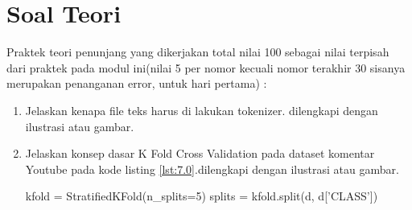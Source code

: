 \section{Soal Teori}
Praktek teori penunjang yang dikerjakan total nilai 100 sebagai nilai terpisah dari praktek pada modul ini(nilai 5 per nomor kecuali nomor terakhir 30 sisanya merupakan penanganan error, untuk hari pertama) :
\begin{enumerate}
\item
Jelaskan kenapa file teks harus di lakukan tokenizer. dilengkapi dengan ilustrasi atau gambar.
\item
Jelaskan konsep dasar K Fold Cross Validation pada dataset komentar Youtube pada kode listing \ref{lst:7.0}.dilengkapi dengan ilustrasi atau gambar.
\begin{listing}[caption=K Fold Cross Validation,label={lst:7.0}]
kfold = StratifiedKFold(n_splits=5)
splits = kfold.split(d, d['CLASS'])
\end{listing}


\end{enumerate}
